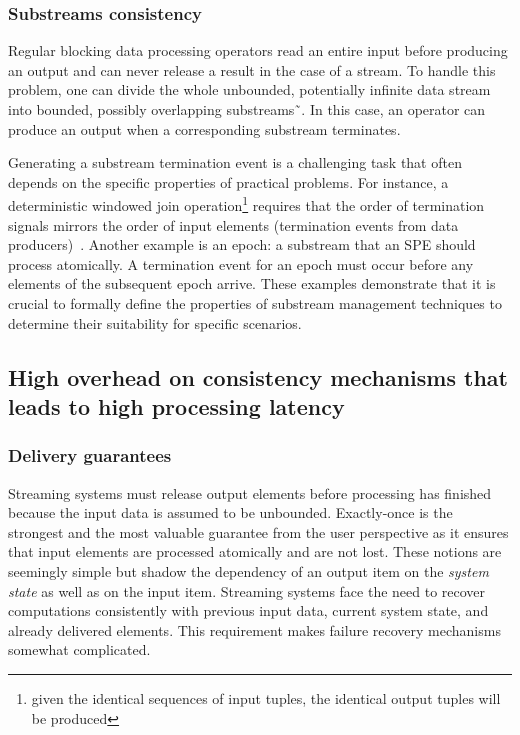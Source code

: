 \subsubsection{Substreams consistency}


Regular blocking data processing operators read an entire input before producing an output and can never release a result in the case of a stream. To handle this problem, one can divide the whole unbounded, potentially infinite data stream into bounded, possibly overlapping substreams˜\cite{tucker2003exploiting}. In this case, an operator can produce an output when a corresponding substream terminates.

Generating a substream termination event is a challenging task that often depends on the specific properties of practical problems. For instance, a deterministic windowed join operation\footnote{given the identical sequences of input tuples, the identical output tuples will be produced} requires that the order of termination signals mirrors the order of input elements (termination events from data producers)~\cite{najdataei2019stretch, gulisano2016scalejoin}. Another example is an epoch: a substream that an SPE should process atomically. A termination event for an epoch must occur before any elements of the subsequent epoch arrive. These examples demonstrate that it is crucial to formally define the properties of substream management techniques to determine their suitability for specific scenarios.

\subsection{High overhead on consistency mechanisms that leads to high processing latency}

\subsubsection{Delivery guarantees}


Streaming systems must release output elements before processing has finished because the input data is assumed to be unbounded. Exactly-once is the strongest and the most valuable guarantee from the user perspective as it ensures that input elements are processed atomically and are not lost. These notions are seemingly simple but shadow the dependency of an output item on the {\em system state} as well as on the input item. 
Streaming systems face the need to recover computations consistently with previous input data, current system state, and already delivered elements.
This requirement makes failure recovery mechanisms somewhat complicated. 


